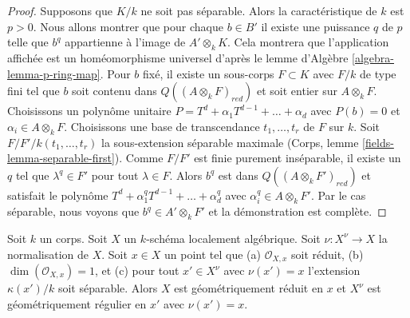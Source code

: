 \begin{proof}
\medskip\noindent
 Supposons que $K/k$ ne soit pas séparable. Alors la caractéristique de $k$ est $p > 0$.
Nous allons montrer que pour chaque $b \in B'$ il existe une puissance $q$ de $p$
 telle que $b^q$ appartienne à l'image de $A' \otimes_k K$. Cela montrera
que l'application affichée est un homéomorphisme universel d'après le
lemme d'Algèbre \ref{algebra-lemma-p-ring-map}.
Pour $b$ fixé, il existe un sous-corps $F \subset K$
 avec $F/k$ de type fini tel que $b$ soit contenu dans 
$Q((A \otimes_k F)_{red})$ et soit entier sur $A \otimes_k F$.
Choisissons un polynôme unitaire $P = T^d + \alpha_1 T^{d - 1} + \ldots + \alpha _d$
 avec $P(b) = 0$ et $\alpha_i \in A \otimes_k F$.
Choisissons une base de transcendance $t_1, \ldots, t_r$ de $F$ sur $k$.
Soit $F/F'/k(t_1, \ldots, t_r)$ la sous-extension
séparable maximale (Corps, lemme \ref{fields-lemma-separable-first}).
Comme $F/F'$ est finie purement inséparable, il existe un $q$ tel
que $\lambda^q \in F'$ pour tout $\lambda \in F$. Alors $b^q$ est
dans $Q((A \otimes_k F')_{red})$ et satisfait le polynôme 
$T^d + \alpha_1^q T^{d - 1} + \ldots + \alpha _d^q$ avec 
$\alpha_i^q \in A \otimes_k F'$. Par le cas séparable,
nous voyons que $b^q \in A' \otimes_k F'$ et la démonstration est complète. 
\end{proof}

\begin{lemma}
\label{lemma-geometrically-normal-in-codim-1}
 Soit $k$ un corps. Soit $X$ un $k$-schéma localement algébrique. Soit
$\nu : X^\nu \to X$ la normalisation de $X$.
Soit $x \in X$ un point tel que (a) $\mathcal{O}_{X, x}$
 soit réduit, (b) $\dim(\mathcal{O}_{X, x}) = 1$, et
(c) pour tout $x' \in X^\nu$ avec $\nu(x') = x$ l'extension 
$\kappa(x')/k$ soit séparable. Alors $X$ est géométriquement réduit en $x$
 et $X^\nu$ est géométriquement régulier en $x'$ avec $\nu(x') = x$. 
\end{lemma}

